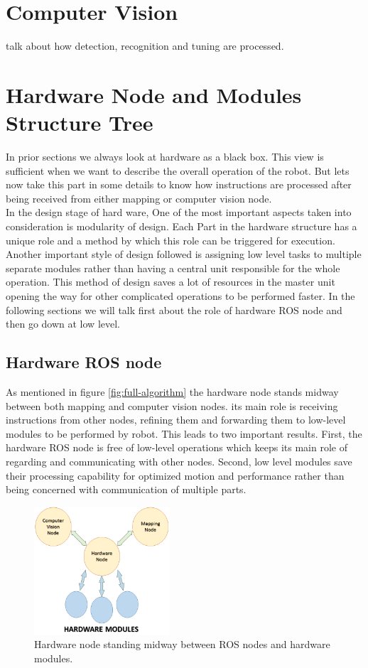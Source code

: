 \documentclass[12pt]{article}
\begin{document}
\newpage

\section{Computer Vision}
talk about how detection, recognition and tuning are processed.

\newpage

\section{Hardware Node and Modules Structure Tree}
In prior sections we always look at hardware as a black box. This view is sufficient when we want to describe the overall operation of the robot. But lets now take this part in some details to know how instructions are processed after being received from either mapping or computer vision node. \\
In the design stage of hard ware, One of the most important aspects taken into consideration is modularity of design. Each Part in the hardware structure has a unique role and a method by which this role can be triggered for execution. Another important style of design followed is assigning low level tasks to multiple separate modules rather than having a central unit responsible for the whole operation. This method of design saves a lot of resources in the master unit opening the way for other complicated operations to be performed faster. In the following sections we will talk first about the role of hardware ROS node and then go down at low level.

\subsection{Hardware ROS node}
As mentioned in figure \ref{fig:full-algorithm} the hardware node stands midway between both mapping and computer vision nodes. its main role is receiving instructions from other nodes, refining them and forwarding them to low-level modules to be performed by robot. This leads to two important results. First, the hardware ROS node is free of low-level operations which keeps its main role of regarding and communicating with other nodes. Second, low level modules save their processing capability for optimized motion and performance rather than being concerned with communication of multiple parts. 
\begin{figure}[H]
	\centering
	\includegraphics[width =0.45\textwidth]{Fig/hw-node.png}
	\caption{Hardware node standing midway between ROS nodes and hardware modules.}
	\label{fig:hw-node}
\end{figure}
\end{document}
